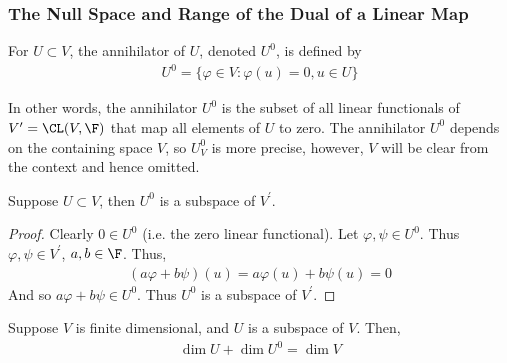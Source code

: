 \documentclass{article}
\begin{document}
\subsubsection{The Null Space and Range of the Dual of a Linear Map}
  \begin{defn}[Annihilator, $U^0$]
    For $U \subset V$, the annihilator of $U$, denoted $U^0$, is defined by
    \begin{align*}
      U^0 = \{\varphi \in V: \varphi(u) = 0, u \in U\}
    \end{align*}
  \end{defn}
  In other words, the annihilator $U^0$ is the subset of all linear functionals of $V^\prime = \CL(V, \F)$ that map all elements of $U$ to zero. The annihilator $U^0$ depends on the
  containing space $V$, so $U^0_V$ is more precise, however, $V$ will be clear from the context and hence omitted.
  \begin{prop}
    Suppose $U \subset V$, then $U^0$ is a subspace of $V^\prime$.
  \end{prop}
  \begin{proof}
    Clearly $0 \in U^0$ (i.e. the zero linear functional). Let $\varphi, \psi \in U^0$. Thus $\varphi, \psi \in V^{\prime}$, $a, b \in \F$. Thus,
    \begin{align*}
      (a\varphi + b\psi)(u) = a\varphi(u) + b\psi(u) = 0
    \end{align*}
    And so $a\varphi + b\psi \in U^0$. Thus $U^0$ is a subspace of $V^\prime$.
  \end{proof}
  \begin{prop}\label{prop:dim_annihilator}
    Suppose $V$ is finite dimensional, and $U$ is a subspace of $V$. Then,
    \begin{align*}
      \dim U + \dim U^0 = \dim V
    \end{align*}
  \end{prop}
\end{document}
